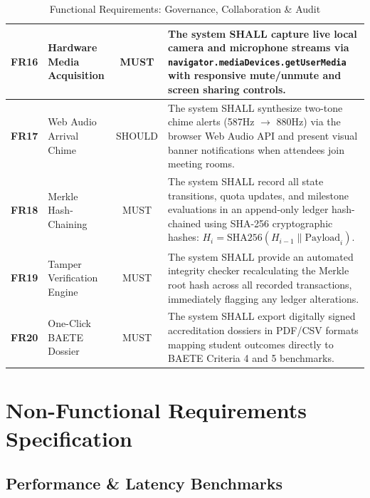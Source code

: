 \documentclass[10.5pt,a4paper]{article}
\begin{document}
\begin{table}[h]
\begin{tabularx}{\linewidth}{|l|l|c|X|}
\textbf{FR16} & Hardware Media Acquisition & MUST & The system SHALL capture live local camera and microphone streams via \texttt{navigator.mediaDevices.getUserMedia} with responsive mute/unmute and screen sharing controls. \\ \hline
\textbf{FR17} & Web Audio Arrival Chime & SHOULD & The system SHALL synthesize two-tone chime alerts (587Hz $\rightarrow$ 880Hz) via the browser Web Audio API and present visual banner notifications when attendees join meeting rooms. \\ \hline
\textbf{FR18} & Merkle Hash-Chaining & MUST & The system SHALL record all state transitions, quota updates, and milestone evaluations in an append-only ledger hash-chained using SHA-256 cryptographic hashes: $H_i = \text{SHA256}(H_{i-1} \parallel \text{Payload}_i)$. \\ \hline
\textbf{FR19} & Tamper Verification Engine & MUST & The system SHALL provide an automated integrity checker recalculating the Merkle root hash across all recorded transactions, immediately flagging any ledger alterations. \\ \hline
\textbf{FR20} & One-Click BAETE Dossier & MUST & The system SHALL export digitally signed accreditation dossiers in PDF/CSV formats mapping student outcomes directly to BAETE Criteria 4 and 5 benchmarks. \\ \hline
\end{tabularx}
\caption{Functional Requirements: Governance, Collaboration \& Audit}
\label{tab:fr_part2}
\end{table}

\clearpage

\section{Non-Functional Requirements Specification}

\subsection{Performance \& Latency Benchmarks}
\end{document}
